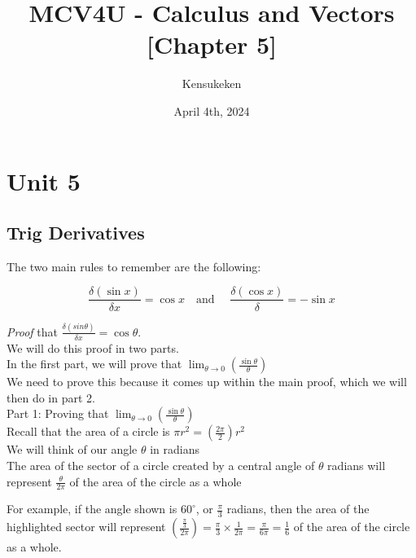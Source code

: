 \documentclass{article}
\title{MCV4U - Calculus and Vectors [Chapter 5]}
\author{Kensukeken}
\date{April 4th, 2024}
\begin{document}
\maketitle

\tableofcontents
\newpage
\section{Unit 5}
\subsection{Trig Derivatives }
The two main rules to remember are the following:
\begin{tcolorbox}[sharp corners=uphill,
    colback=purple!50!white,colframe=blue!25!black,coltext=yellow,
    fontupper=\Large\bfseries,arc=6mm,boxrule=2mm,boxsep=5mm]
$$\frac{\delta (\sin x)}{\delta x}=\cos x \quad \text{and } \quad \frac{\delta(\cos x)}{\delta}=-\sin x$$
\end{tcolorbox}
\textit{Proof} that $\frac{\delta (sin \theta)}{\delta x}=\cos \theta$.\\
We will do this proof in two parts. \\

In the first part, we will prove that  $\lim_{\theta \to 0}\left( \frac{\sin \theta }{\theta}\right)$\\

We need to prove this because it comes up within the main proof, which we will then do in part 2.\\

Part 1: Proving that $\lim_{\theta \to 0}\left( \frac{\sin \theta }{\theta}\right)$\\

Recall that the area of a circle is $\pi r^2=(\frac{2 \pi}{2})r^2$ \\
We will think of our angle $\theta$ in radians \\
The area of the sector of a circle created by a central angle of $\theta$ radians will represent $\frac{\theta}{2\pi}$ of the area of the circle as a whole \\

\begin{minipage}{0.5\textwidth}
For example, if the angle shown is $60^{\circ}$, or $\frac{\pi}{3}$ radians, then the area of the highlighted sector will represent $\left(\frac{\frac{\pi}{3}}{2\pi}\right)=\frac{\pi}{3}\times \frac{1}{2\pi}=\frac{\pi}{6\pi}=\frac{1}{6}$ of the area of the circle as a whole.
\end{minipage}
\hspace{1em}
\begin{minipage}{0.5\textwidth}
\end{minipage}
\end{document}
